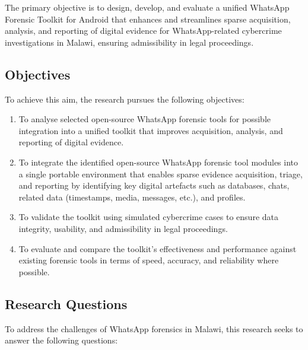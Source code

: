 \documentclass[12pt,a4paper]{report}
\begin{document}
The primary objective is to design, develop, and evaluate a unified WhatsApp Forensic Toolkit for Android that enhances and streamlines sparse acquisition, analysis, and reporting of digital evidence for WhatsApp-related cybercrime investigations in Malawi, ensuring admissibility in legal proceedings.

\subsection{Objectives}

To achieve this aim, the research pursues the following objectives:

\begin{enumerate}
    \item To analyse selected open-source WhatsApp forensic tools for possible integration into a unified toolkit that improves acquisition, analysis, and reporting of digital evidence.

    \item To integrate the identified open-source WhatsApp forensic tool modules into a single portable environment that enables sparse evidence acquisition, triage, and reporting by identifying key digital artefacts such as databases, chats, related data (timestamps, media, messages, etc.), and profiles.

    \item To validate the toolkit using simulated cybercrime cases to ensure data integrity, usability, and admissibility in legal proceedings.

    \item To evaluate and compare the toolkit's effectiveness and performance against existing forensic tools in terms of speed, accuracy, and reliability where possible.
\end{enumerate}

\subsection{Research Questions}

To address the challenges of WhatsApp forensics in Malawi, this research seeks to answer the following questions:
\end{document}
